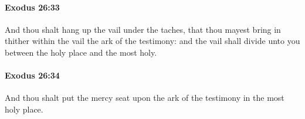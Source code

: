 		\paragraph{Exodus 26:33} %
			\label{EXODUS-26-33}

			And thou shalt hang up the vail under the taches, that thou mayest bring in thither within the vail the ark of the testimony: and the vail shall divide unto you between the holy place and the most holy.


		\paragraph{Exodus 26:34} %
			\label{EXODUS-26-34}

			And thou shalt put the mercy seat upon the ark of the testimony in the most holy place.


